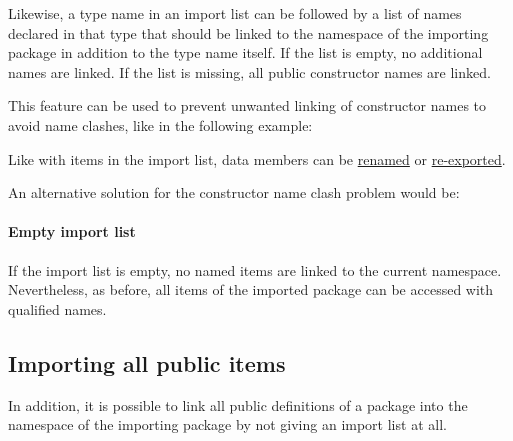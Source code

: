 Likewise, a type name in an import list can be followed by a list of names declared in that type that should be linked to the namespace of the importing package in addition to the type name itself. If the list is empty, no additional names are linked. If the list is missing, all public constructor names are linked.

This feature can be used to prevent unwanted linking of constructor names to avoid name clashes, like in the following example:


Like with items in the import list, data members can be  \hyperref[renameitem]{renamed} 
or  \hyperref[reexport]{re-exported}.
  
An alternative solution for the constructor name clash problem would be:


\paragraph*{Empty import list} If the import list is empty, no named items are linked to the current namespace. Nevertheless, as before, all items of the imported package can be accessed with qualified names.

\subsection{Importing all public items}

In addition, it is possible to link all public definitions of a
package into the namespace of the importing package by not giving an import list at all.

